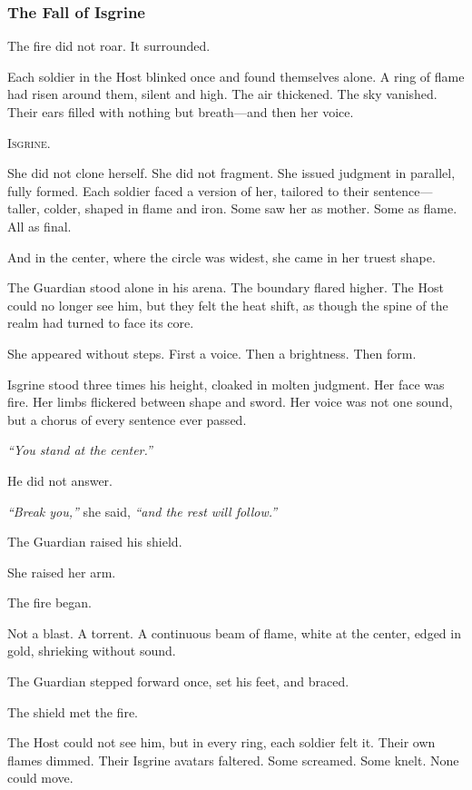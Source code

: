 \documentclass[12pt]{article}
\begin{document}
\dotfill

\subsubsection*{The Fall of Isgrine}

The fire did not roar. It surrounded.

Each soldier in the Host blinked once and found themselves alone. A ring of flame had risen around them, silent and high. The air thickened. The sky vanished. Their ears filled with nothing but breath—and then her voice.

\textsc{Isgrine.}

She did not clone herself. She did not fragment. She issued judgment in parallel, fully formed. Each soldier faced a version of her, tailored to their sentence—taller, colder, shaped in flame and iron. Some saw her as mother. Some as flame. All as final.

And in the center, where the circle was widest, she came in her truest shape.

The Guardian stood alone in his arena. The boundary flared higher. The Host could no longer see him, but they felt the heat shift, as though the spine of the realm had turned to face its core.

She appeared without steps. First a voice. Then a brightness. Then form.

Isgrine stood three times his height, cloaked in molten judgment. Her face was fire. Her limbs flickered between shape and sword. Her voice was not one sound, but a chorus of every sentence ever passed.

\textit{``You stand at the center.''}

He did not answer.

\textit{``Break you,''} she said, \textit{``and the rest will follow.''}

The Guardian raised his shield.

She raised her arm.

The fire began.

Not a blast. A torrent. A continuous beam of flame, white at the center, edged in gold, shrieking without sound.

The Guardian stepped forward once, set his feet, and braced.

The shield met the fire.

The Host could not see him, but in every ring, each soldier felt it. Their own flames dimmed. Their Isgrine avatars faltered. Some screamed. Some knelt. None could move.
\end{document}
